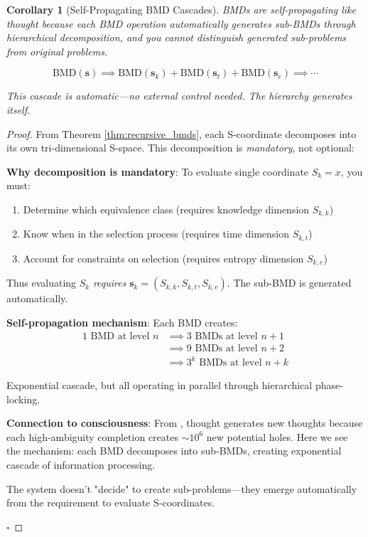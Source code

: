 \documentclass[12pt,a4paper]{article}
\newtheorem{corollary}[theorem]{Corollary}
\begin{document}
\begin{corollary}[Self-Propagating BMD Cascades]
\label{cor:self_propagating}
BMDs are self-propagating like thought because each BMD operation automatically generates sub-BMDs through hierarchical decomposition, and you cannot distinguish generated sub-problems from original problems.

\begin{equation}
\text{BMD}(\mathbf{s}) \implies \text{BMD}(\mathbf{s}_k) + \text{BMD}(\mathbf{s}_t) + \text{BMD}(\mathbf{s}_e) \implies \cdots
\end{equation}

This cascade is automatic—no external control needed. The hierarchy generates itself.
\end{corollary}

\begin{proof}
From Theorem \ref{thm:recursive_bmds}, each S-coordinate decomposes into its own tri-dimensional S-space. This decomposition is \textit{mandatory}, not optional:

\textbf{Why decomposition is mandatory}: To evaluate single coordinate $S_k = x$, you must:
\begin{enumerate}
\item Determine which equivalence class (requires knowledge dimension $S_{k,k}$)
\item Know when in the selection process (requires time dimension $S_{k,t}$)
\item Account for constraints on selection (requires entropy dimension $S_{k,e}$)
\end{enumerate}

Thus evaluating $S_k$ \textit{requires} $\mathbf{s}_k = (S_{k,k}, S_{k,t}, S_{k,e})$. The sub-BMD is generated automatically.

\textbf{Self-propagation mechanism}: Each BMD creates:
\begin{align}
1 \text{ BMD at level } n &\implies 3 \text{ BMDs at level } n+1 \\
&\implies 9 \text{ BMDs at level } n+2 \\
&\implies 3^k \text{ BMDs at level } n+k
\end{align}

Exponential cascade, but all operating in parallel through hierarchical phase-locking.

\textbf{Connection to consciousness}: From \cite{sachikonye2024consciousness}, thought generates new thoughts because each high-ambiguity completion creates $\sim 10^6$ new potential holes. Here we see the mechanism: each BMD decomposes into sub-BMDs, creating exponential cascade of information processing.

The system doesn't "decide" to create sub-problems—they emerge automatically from the requirement to evaluate S-coordinates.

$\square$
\end{proof}
\end{document}
